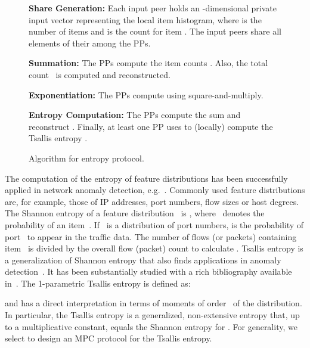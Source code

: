 \documentclass[letterpaper,11pt,onecolumn,titlepage]{article}
\begin{document}
\begin{figure}[t]
	\begin{boxedminipage}{1\textwidth}
	\begin{small}
	\begin{compactenum}
	
	\item \textbf{Share Generation:} Each input peer holds an -dimensional private input vector
		 representing the local item histogram, where  is the number of items and  is the count
		for item . The input peers share all elements of their  among the PPs.
	
	\item \textbf{Summation:} The PPs compute the item counts . Also, the total count~ is computed and reconstructed. 
	
	\item \textbf{Exponentiation:} The PPs compute  using square-and-multiply.


	\item \textbf{Entropy Computation:} The PPs compute the sum  and reconstruct .
	Finally, at least one PP uses  to (locally) compute the
	Tsallis entropy .
	
	\end{compactenum}
	\end{small}
	\end{boxedminipage}
	\caption{Algorithm for entropy protocol.}
	\label{box:entropy}
\end{figure}


The computation of the entropy of feature distributions has been
successfully applied in network anomaly detection, 
e.g.~\cite{SubspaceMethod05,brauckhoff2009applying,li2006dai,ziviani2007nad}.
Commonly used feature
distributions are, for example, those of IP addresses, port numbers, flow sizes
or host degrees. 
The Shannon entropy of a feature distribution~ is , where~ denotes the
probability of an item~. If~ is a distribution of port numbers,
 is the probability of port~ to appear in the traffic
data. The number of flows (or packets) containing item~ is divided
by the overall flow (packet) count to calculate . Tsallis
entropy is a generalization of Shannon
entropy that also finds applications in anomaly
detection~\cite{ziviani2007nad,tellenbach2009tsallis}. 
It has been substantially studied with a rich bibliography available in~\cite{tsallis}. 
The 1-parametric Tsallis entropy is defined as:

and has a direct interpretation in terms of moments of order~ of
the distribution. In particular,
the Tsallis entropy is a generalized, non-extensive entropy that, up to a multiplicative constant, 
equals the Shannon entropy for \mbox{}. 
For generality, we select to design an MPC protocol for the Tsallis entropy.
\end{document}
